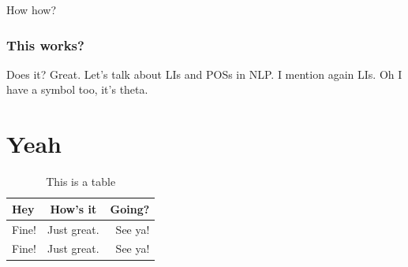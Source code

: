 How how?

\subsubsection{This works?}
Does it? Great. Let's talk about \glspl{LI} and \glspl{POS} in \gls{NLP}. I mention again \glspl{LI}. Oh I have a symbol too, it's \gls{theta}.

\section{Yeah}
\lipsum[5]

\begin{table}[hbt!]
\caption{This is a table}
\centering
\begin{tabular}{ l c r }
\hline
Hey & How's it & Going?\\ \hline
Fine! & Just great. & See ya!\\
Fine! & Just great. & See ya!\\
\hline
\end{tabular}
\end{table}

\lipsum[7-12]